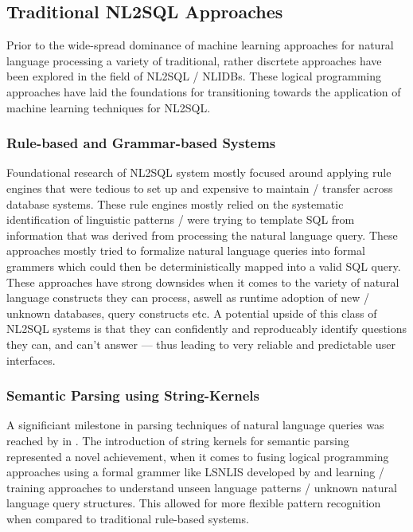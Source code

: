 \subsection{Traditional NL2SQL Approaches}


Prior to the wide-spread dominance of machine learning approaches for natural language processing a variety of
traditional, rather discrtete approaches have been explored in the field of NL2SQL / NLIDBs. These logical
programming approaches have laid the foundations for transitioning towards the application of machine learning
techniques for NL2SQL.

\subsubsection{Rule-based and Grammar-based Systems}

Foundational research of NL2SQL system mostly focused around applying rule engines that were tedious to set up and
expensive to maintain / transfer across database systems. These rule engines mostly relied on the systematic 
identification of linguistic patterns / were trying to template SQL from information that was derived from processing the 
natural language query. \citep{Rendezvous, Lunar, Ladder} These approaches mostly tried to formalize natural language 
queries into formal grammers which could then be deterministically mapped into a valid SQL query. \citep{Lunar} These 
approaches have strong downsides when it comes to the variety of natural language constructs they can process, aswell as 
runtime adoption of new / unknown databases, query constructs etc. A potential upside of this class of NL2SQL systems is 
that they can confidently and reproducably identify questions they can, and can't answer — thus leading to very reliable 
and predictable user interfaces.

\subsubsection{Semantic Parsing using String-Kernels}

A significiant milestone in parsing techniques of natural language queries was reached by \citeauthor*{StringKernels} in 
\citeyear{StringKernels}. The introduction of string kernels for semantic parsing represented a novel achievement, when 
it comes to fusing logical programming approaches using a formal grammer like LSNLIS developed by \cite{Lunar} and 
learning / training approaches to understand unseen language patterns / unknown natural language query structures. This 
allowed for more flexible pattern recognition when compared to traditional rule-based systems.


